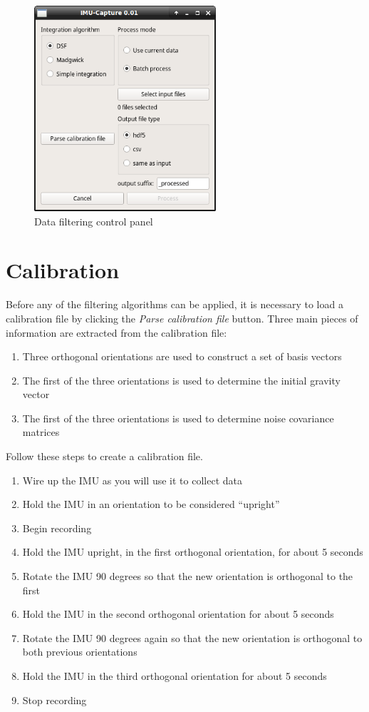 \documentclass[11pt,letterpaper,article,oneside]{memoir}
\begin{document}
\begin{figure}[]
    \begin{center}
        \includegraphics[height=3in]{screenshot_process}
    \end{center}
    \caption{Data filtering control panel} 
    \label{fig:filter}
\end{figure}


\section{Calibration}

Before any of the filtering algorithms can be applied, it is necessary to load a
calibration file by clicking the \emph{Parse calibration file} button. Three
main pieces of information are extracted from the calibration file:
\begin{enumerate}
\item Three orthogonal orientations are used to construct a set of basis vectors
\item The first of the three orientations is used to determine the initial gravity vector
\item The first of the three orientations is used to determine noise covariance matrices
\end{enumerate}


Follow these steps to create a calibration file.

\begin{enumerate}
\item Wire up the IMU as you will use it to collect data
\item Hold the IMU in an orientation to be considered ``upright''
\item Begin recording
\item Hold the IMU upright, in the first orthogonal orientation, for about 5 seconds
\item Rotate the IMU 90 degrees so that the new orientation is orthogonal to the first
\item Hold the IMU in the second orthogonal orientation for about 5 seconds
\item Rotate the IMU 90 degrees again so that the new orientation is orthogonal to both previous orientations
\item Hold the IMU in the third orthogonal orientation for about 5 seconds
\item Stop recording
\end{enumerate}
\end{document}
